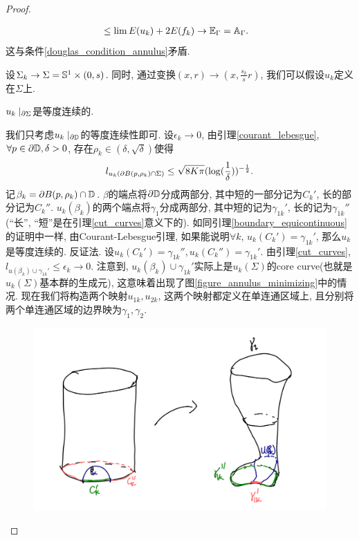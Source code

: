 \begin{proof}
\begin{claim}
\begin{subproof}
\begin{equation}
\begin{split}
                    &\le \lim E(u_k) + 2E(f_k) \to \EE_\Gamma=\AA_\Gamma.
                \end{split}
            \end{equation}
            这与条件\eqref{douglas_condition_annulus}矛盾.
        \end{subproof}
    \end{claim}
    设$\Sigma_k \to \Sigma = \S^1 \times (0,s)$. 同时, 通过变换$(x,r) \to (x,\frac{s_k}{s}r)$, 我们可以假设$u_k$定义在$\Sigma$上.
    \begin{claim}
        $u_k\mid_{\P \Sigma}$是等度连续的.
        \begin{subproof}
            我们只考虑$u_k\mid_{\P \D}$的等度连续性即可.  设$\epsilon_k \to 0$, 由引理\eqref{courant_lebesgue}, $\forall p \in \P \D, \delta>0$, 存在$\rho_k \in (\delta,\sqrt{\delta})$使得
            \begin{equation}
                l_{u_k(\P B(p,\rho_k) \cap \Sigma)} \le \sqrt{8K\pi}(\log(\rec{\delta}))^{-\rec{2}}.
            \end{equation}
            记$\beta_k=\P B(p,\rho_k) \cap \D$. $\beta$的端点将$\P \D$分成两部分, 其中短的一部分记为$C_k'$, 长的部分记为$C_k''$. $u_k(\beta_k)$的两个端点将$\gamma_1$分成两部分, 其中短的记为$\gamma_{1k}'$, 长的记为$\gamma_{1k}''$(``长'', ``短''是在引理\eqref{cut_curves}意义下的). 如同引理\eqref{boundary_equicontinuous}的证明中一样, 由Courant-Lebesgue引理,  如果能说明$\forall k$, $u_k(C_k')=\gamma_{1k}'$, 那么$u_k$是等度连续的.  反证法. 设$u_k(C_k')=\gamma_{1k}'', u_k(C_k'')=\gamma_{1k}'$. 由引理\eqref{cut_curves}, $l_{u(\beta_k)\cup \gamma_{1k}'} \le \epsilon_k \to 0$.  注意到, $u_k(\beta_k) \cup \gamma_{1k}'$实际上是$u_k(\Sigma)$的core curve(也就是$u_k(\Sigma)$基本群的生成元), 这意味着出现了图\eqref{figure_annulus_minimizing}中的情况. 现在我们将构造两个映射$u_{1k}, u_{2k}$, 这两个映射都定义在单连通区域上, 且分别将两个单连通区域的边界映为$\gamma_1, \gamma_2$. 
            \begin{figure}[ht]
                \centering
                \includegraphics[scale=0.4]{images/pinch.png}

\end{figure}
\end{subproof}
\end{claim}
\end{proof}
